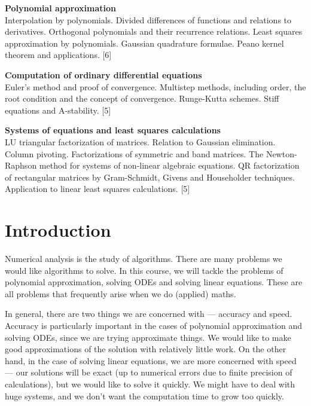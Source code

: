 \documentclass[a4paper]{article}
\begin{document}
\maketitle
{\small
\noindent\textbf{Polynomial approximation}\\
Interpolation by polynomials. Divided differences of functions and relations to derivatives. Orthogonal polynomials and their recurrence relations. Least squares approximation by polynomials. Gaussian quadrature formulae. Peano kernel theorem and applications.\hspace*{\fill} [6]

\vspace{10pt}
\noindent\textbf{Computation of ordinary differential equations}\\
Euler's method and proof of convergence. Multistep methods, including order, the root condition and the concept of convergence. Runge-Kutta schemes. Stiff equations and A-stability.\hspace*{\fill} [5]

\vspace{10pt}
\noindent\textbf{Systems of equations and least squares calculations}\\
LU triangular factorization of matrices. Relation to Gaussian elimination. Column pivoting. Factorizations of symmetric and band matrices. The Newton-Raphson method for systems of non-linear algebraic equations. QR factorization of rectangular matrices by Gram-Schmidt, Givens and Householder techniques. Application to linear least squares calculations.\hspace*{\fill} [5]}

\tableofcontents
\setcounter{section}{-1}
\section{Introduction}
Numerical analysis is the study of algorithms. There are many problems we would like algorithms to solve. In this course, we will tackle the problems of polynomial approximation, solving ODEs and solving linear equations. These are all problems that frequently arise when we do (applied) maths.

In general, there are two things we are concerned with --- accuracy and speed. Accuracy is particularly important in the cases of polynomial approximation and solving ODEs, since we are trying approximate things. We would like to make good approximations of the solution with relatively little work. On the other hand, in the case of solving linear equations, we are more concerned with speed --- our solutions will be exact (up to numerical errors due to finite precision of calculations), but we would like to solve it quickly. We might have to deal with huge systems, and we don't want the computation time to grow too quickly.
\end{document}
